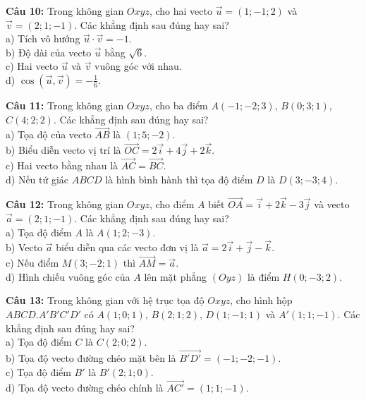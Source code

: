 \documentclass[12pt]{article}
\begin{document}
	\vspace{4mm}
	\noindent \textbf{Câu 10:} Trong không gian $Oxyz$, cho hai vecto $\vec{u} = (1; -1; 2)$ và $\vec{v} = (2; 1; -1)$. Các khẳng định sau đúng hay sai? \\
	\noindent a) Tích vô hướng $\vec{u} \cdot \vec{v} = -1$. \\
	\noindent b) Độ dài của vecto $\vec{u}$ bằng $\sqrt{6}$. \\
	\noindent c) Hai vecto $\vec{u}$ và $\vec{v}$ vuông góc với nhau. \\
	\noindent d) $\cos(\vec{u}, \vec{v}) = -\frac{1}{6}$.
	
	\noindent \textbf{Câu 11:} Trong không gian $Oxyz$, cho ba điểm $A(-1; -2; 3)$, $B(0; 3; 1)$, $C(4; 2; 2)$. Các khẳng định sau đúng hay sai? \\
	\noindent a) Tọa độ của vecto $\vec{AB}$ là $(1; 5; -2)$. \\
	\noindent b) Biểu diễn vecto vị trí là $\vec{OC} = 2\vec{i} + 4\vec{j} + 2\vec{k}$. \\
	\noindent c) Hai vecto bằng nhau là $\vec{AC} = \vec{BC}$. \\
	\noindent d) Nếu tứ giác $ABCD$ là hình bình hành thì tọa độ điểm $D$ là $D(3; -3; 4)$.
	
	\vspace{4mm}
	\noindent \textbf{Câu 12:} Trong không gian $Oxyz$, cho điểm $A$ biết $\vec{OA} = \vec{i} + 2\vec{k} - 3\vec{j}$ và vecto $\vec{a} = (2; 1; -1)$. Các khẳng định sau đúng hay sai? \\
	\noindent a) Tọa độ điểm $A$ là $A(1; 2; -3)$. \\
	\noindent b) Vecto $\vec{a}$ biểu diễn qua các vecto đơn vị là $\vec{a} = 2\vec{i} + \vec{j} - \vec{k}$. \\
	\noindent c) Nếu điểm $M(3; -2; 1)$ thì $\vec{AM} = \vec{a}$. \\
	\noindent d) Hình chiếu vuông góc của $A$ lên mặt phẳng $(Oyz)$ là điểm $H(0; -3; 2)$.
	
	\vspace{4mm}
	\noindent \textbf{Câu 13:} Trong không gian với hệ trục tọa độ $Oxyz$, cho hình hộp $ABCD.A'B'C'D'$ có $A(1; 0; 1)$, $B(2; 1; 2)$, $D(1; -1; 1)$ và $A'(1; 1; -1)$. Các khẳng định sau đúng hay sai? \\
	\noindent a) Tọa độ điểm $C$ là $C(2; 0; 2)$. \\
	\noindent b) Tọa độ vecto đường chéo mặt bên là $\vec{B'D'} = (-1; -2; -1)$. \\
	\noindent c) Tọa độ điểm $B'$ là $B'(2; 1; 0)$. \\
	\noindent d) Tọa độ vecto đường chéo chính là $\vec{AC'} = (1; 1; -1)$.
	
\end{document}
